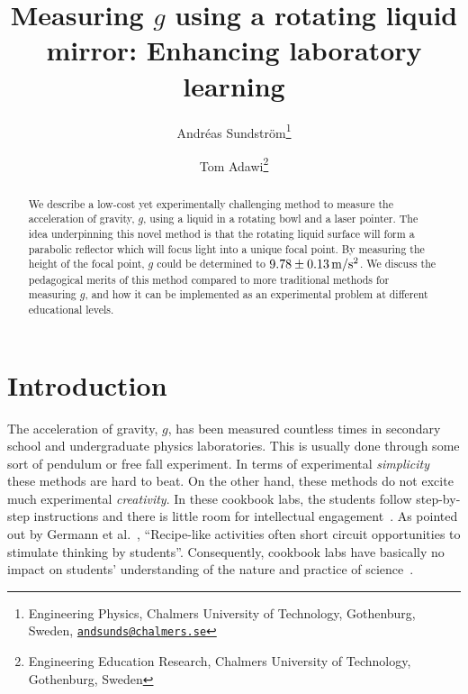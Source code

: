 \documentclass[12pt, a4paper, twocolumn]{article}
\begin{document}
\title{Measuring $g$ using a rotating liquid mirror:
  Enhancing laboratory learning} 

\newcommand{\andsunds}{andsunds@chalmers.se}
\author{Andréas Sundström\footnote{Engineering Physics, Chalmers
    University of Technology, Gothenburg, Sweden,
    \textcolor{blue}{\href{mailto:\andsunds}{\nolinkurl{\andsunds}}} }
\and Tom Adawi\footnote{Engineering Education Research, Chalmers
  University of Technology, Gothenburg, Sweden} 
}
\maketitle

\begin{abstract}
We describe a low-cost yet experimentally challenging method to measure the acceleration of gravity, $g$, using a liquid in a rotating bowl and a laser pointer. The idea underpinning this novel method is that the rotating liquid surface will form a parabolic reflector which will focus light into a unique focal point. By measuring the height of the focal point, $g$ could be determined to $\unit[9.78 \pm 0.13]{m/s^2}$. We discuss the pedagogical merits of this method compared to more traditional methods for measuring $g$, and how it can be implemented as an experimental problem at different educational levels. 
\end{abstract}


\section{Introduction}

The acceleration of gravity, $g$, has been measured countless times in secondary school and undergraduate physics laboratories. This is usually done through some sort of pendulum or free fall experiment. In terms of experimental \emph{simplicity} these methods are hard to beat. On the other hand, these methods do not excite much experimental \emph{creativity}. In these cookbook labs, the students follow step-by-step instructions and there is little room for intellectual engagement~\cite{Wieman2015}. As pointed out by Germann et al.~\cite{Germann1996}, 
``Recipe-like activities often short circuit opportunities to stimulate thinking by students''. 
Consequently, cookbook labs have basically no impact on students' understanding of the nature and practice of science~\cite{Domin1999}. 
\end{document}
